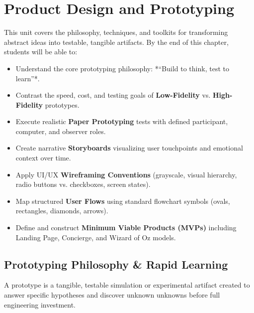 \chapter{Product Design and Prototyping}
\label{chap:product_design_prototyping}

\begin{tcolorbox}[enhanced, colback=boxnavybg, colframe=brandnavy, boxrule=1.2pt, arc=4pt, title={\Large\bfseries\sffamily Unit 4 Overview \& Learning Objectives}]
\sffamily\normalsize
This unit covers the philosophy, techniques, and toolkits for transforming abstract ideas into testable, tangible artifacts. By the end of this chapter, students will be able to:
\begin{itemize}[leftmargin=1.2em, itemsep=2pt, topsep=3pt]
    \item Understand the core prototyping philosophy: *``Build to think, test to learn''*.
    \item Contrast the speed, cost, and testing goals of \textbf{Low-Fidelity} vs. \textbf{High-Fidelity} prototypes.
    \item Execute realistic \textbf{Paper Prototyping} tests with defined participant, computer, and observer roles.
    \item Create narrative \textbf{Storyboards} visualizing user touchpoints and emotional context over time.
    \item Apply UI/UX \textbf{Wireframing Conventions} (grayscale, visual hierarchy, radio buttons vs. checkboxes, screen states).
    \item Map structured \textbf{User Flows} using standard flowchart symbols (ovals, rectangles, diamonds, arrows).
    \item Define and construct \textbf{Minimum Viable Products (MVPs)} including Landing Page, Concierge, and Wizard of Oz models.
\end{itemize}
\end{tcolorbox}

\section{Prototyping Philosophy \& Rapid Learning}

A prototype is a tangible, testable simulation or experimental artifact created to answer specific hypotheses and discover unknown unknowns before full engineering investment.

